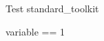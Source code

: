 \begin{zsection}
  \SECTION Test \parents standard\_toolkit
\end{zsection}

\begin{zed}
  variable == 1
\end{zed}
